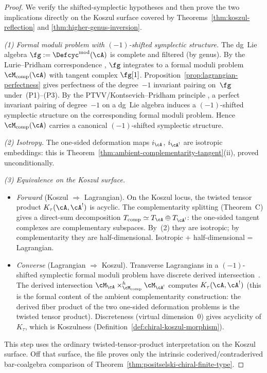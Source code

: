 \begin{proof}
We verify the shifted-symplectic hypotheses and then prove the two
implications directly on the Koszul surface covered by
Theorems~\ref{thm:koszul-reflection} and
\ref{thm:higher-genus-inversion}.

\smallskip\noindent
\emph{(1) Formal moduli problem with $(-1)$-shifted symplectic
structure.}
The dg~Lie algebra $\fg := \Defcyc^{\mathrm{mod}}(\cA)$ is
complete and filtered (by genus). By the Lurie--Pridham
correspondence \cite{LurieDAGX, Pridham17}, $\fg$ integrates
to a formal moduli problem $\cM_{\mathrm{comp}}(\cA)$ with
tangent complex $\fg[1]$.
Proposition~\ref{prop:lagrangian-perfectness} gives perfectness
of the degree~$-1$ invariant pairing on~$\fg$
under~(P1)--(P3).
By the PTVV/Kontsevich--Pridham principle \cite{PTVV13,Pridham17},
a perfect invariant pairing of degree~$-1$ on a dg~Lie algebra
induces a $(-1)$-shifted symplectic structure on the
corresponding formal moduli problem. Hence
$\cM_{\mathrm{comp}}(\cA)$ carries a canonical $(-1)$-shifted
symplectic structure.

\smallskip\noindent
\emph{(2) Isotropy.}
The one-sided deformation maps $i_\cA$, $i_{\cA^!}$ are
isotropic embeddings: this is
Theorem~\ref{thm:ambient-complementarity-tangent}(ii), proved
unconditionally.

\smallskip\noindent
\emph{(3) Equivalence on the Koszul surface.}
\begin{itemize}
\item \emph{Forward} (Koszul $\Rightarrow$ Lagrangian).
 On the Koszul locus, the twisted tensor product
 $K_\tau(\cA, \cA^!)$ is acyclic. The complementarity
 splitting (Theorem~C) gives a direct-sum decomposition
 $T_{\mathrm{comp}} \simeq T_\cA \oplus T_{\cA^!}$:
 the one-sided tangent complexes are complementary subspaces.
 By~(2) they are isotropic; by complementarity they are
 half-dimensional. Isotropic + half-dimensional = Lagrangian.
\item \emph{Converse} (Lagrangian $\Rightarrow$ Koszul).
 Transverse Lagrangians in a $(-1)$-shifted symplectic
 formal moduli problem have discrete derived
 intersection~\cite{PTVV13}. The derived intersection
 $\cM_\cA \times^h_{\cM_{\mathrm{comp}}} \cM_{\cA^!}$
 computes $K_\tau(\cA, \cA^!)$
 (this is the formal content of the ambient complementarity
 construction: the derived fiber product of the two one-sided
 deformation problems is the twisted tensor product).
 Discreteness (virtual dimension~$0$) gives acyclicity of
 $K_\tau$, which is Koszulness
 (Definition~\ref{def:chiral-koszul-morphism}).
\end{itemize}
This step uses the ordinary twisted-tensor-product interpretation on
the Koszul surface. Off that surface, the file proves only the
intrinsic coderived/contraderived bar-coalgebra comparison of
Theorem~\ref{thm:positselski-chiral-finite-type}.


\end{proof}
